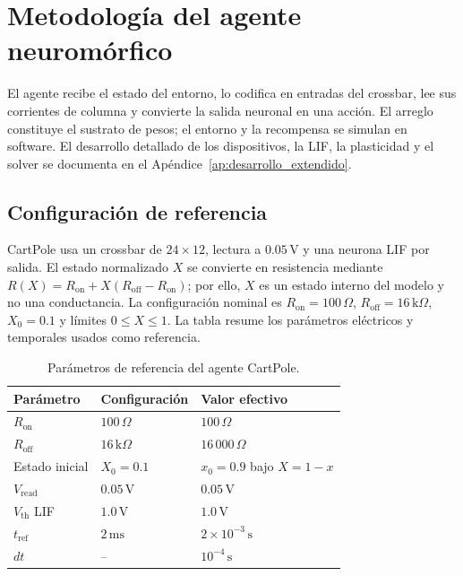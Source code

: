 
\section{Metodolog\'ia del agente neurom\'orfico}
\label{sec:metodologia_agente}
\label{sec:desarrollo}

El agente recibe el estado del entorno, lo codifica en entradas del crossbar,
lee sus corrientes de columna y convierte la salida neuronal en una acci\'on.
El arreglo constituye el sustrato de pesos; el entorno y la recompensa se
simulan en software. El desarrollo detallado de los dispositivos, la LIF,
la plasticidad y el solver se documenta en el Ap\'endice~\ref{ap:desarrollo_extendido}.

\subsection{Configuraci\'on de referencia}

CartPole usa un crossbar de $24\times12$, lectura a $0.05\,\mathrm{V}$ y
una neurona LIF por salida. El estado normalizado $X$ se convierte en
resistencia mediante $R(X)=R_{\mathrm{on}}+X(R_{\mathrm{off}}-R_{\mathrm{on}})$;
por ello, $X$ es un estado interno del modelo y no una conductancia. La
configuraci\'on nominal es $R_{\mathrm{on}}=100\,\Omega$,
$R_{\mathrm{off}}=16\,\mathrm{k}\Omega$, $X_0=0.1$ y l\'imites
$0\leq X\leq1$. La tabla resume los par\'ametros el\'ectricos y temporales
usados como referencia.

\begin{table}[H]
\centering
\small
\caption{Par\'ametros de referencia del agente CartPole.}
\label{tab:parametros_agente}
\begin{tabular}{lll}
\toprule
Par\'ametro & Configuraci\'on & Valor efectivo\\
\midrule
$R_{\mathrm{on}}$ & $100\,\Omega$ & $100\,\Omega$\\
$R_{\mathrm{off}}$ & $16\,\mathrm{k}\Omega$ & $16\,000\,\Omega$\\
Estado inicial & $X_0=0.1$ & $x_0=0.9$ bajo $X=1-x$\\
$V_{\mathrm{read}}$ & $0.05\,\mathrm{V}$ & $0.05\,\mathrm{V}$\\
$V_{\mathrm{th}}$ LIF & $1.0\,\mathrm{V}$ & $1.0\,\mathrm{V}$\\
$t_{\mathrm{ref}}$ & $2\,\mathrm{ms}$ & $2\times10^{-3}\,\mathrm{s}$\\
$dt$ & -- & $10^{-4}\,\mathrm{s}$\\
\bottomrule
\end{tabular}
\end{table}

